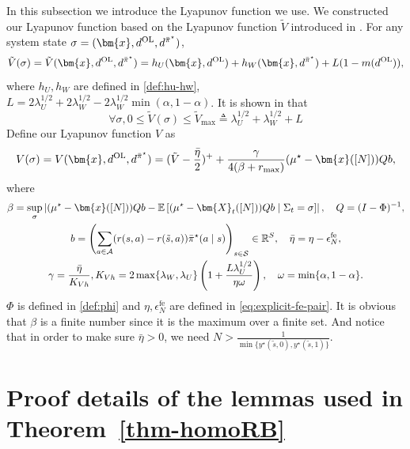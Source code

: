 \documentclass[mnsc,nonblindrev]{informs3}
\newcommand{\E}{\mathbb{E}}
\newcommand{\lwhalf}{\lambda_{W}^{1/2}}
\newcommand{\pibst}{\Bar{\pi}^\star}
\newcommand{\bmx}{\bm{x}}
\newcommand{\States}{\mathcal{S}}
\newcommand{\Actions}{\mathcal{A}}
\newcommand{\enfe}{\epsilon_N^{\mathrm{fe}}}
\begin{document}
\begin{APPENDICES}
In this subsection we introduce the Lyapunov function we use. We constructed our Lyapunov function based on the Lyapunov function $\tilde V$ introduced in \citet{hong2024achieving}. For any system state $\sigma=(\bmx,d^{\mathrm{OL}},d^{\pibst})$,
\begin{equation}\label{eq:def-Vtilde}
    \tilde{V}(\sigma)=\tilde V(\bmx,d^{\mathrm{OL}},d^{\pibst})=h_U(\bmx,d^{\mathrm{OL}})+h_W(\bmx,d^{\pibst})+L(1-m(d^{\mathrm{OL}})),
\end{equation}
where $h_U, h_W$ are defined in \eqref{def:hu-hw}, \(L = 2\lambda_U^{1/2}+2\lwhalf-2\lwhalf\min(\alpha,1-\alpha)\).
It is shown in \citet{hong2024achieving} that 
\begin{equation}\label{eq:def-Vtilde_max}
    \forall \sigma, 0\le \tilde V(\sigma)\le \tilde V_{\max}\triangleq\lambda_U^{1/2}+\lwhalf+L
\end{equation}
Define our Lyapunov function $V$ as
\begin{equation}\label{equ:defi-V}
    V(\sigma)=V(\bmx,d^{\mathrm{OL}},d^{\pibst})=(\tilde V-\frac{\bar\eta}{2})^++\frac{\gamma}{4(\beta+r_{\max})}(\mu^\star-\bmx([N]))Qb,
\end{equation}
where
\begin{equation}\label{eq:def-beta-Q-b-bareta-gamma}
    \begin{gathered}
        \beta=\sup_\sigma\left|(\mu^\star-\bmx([N]))Qb-\E\left[(\mu^\star-\bm{X}_t([N]))Qb\mid \Sigma_t=\sigma\right]\right|, 
        \quad Q=(I-\Phi)^{-1}, \\
        b=\left(\sum_{a\in\Actions}(r(s,a)-r(\tilde s,a))\pibst(a\mid s)\right)_{s\in\States}\in\mathbb{R}^S,
        \quad \bar\eta=\eta-\enfe, \\
        \gamma=\frac{\bar\eta}{K_{Vh}},K_{Vh}=2\max\{\lambda_W,\lambda_U\}\left(1+\frac{L\lambda_U^{1/2}}{\eta\omega}\right), 
        \quad \omega=\min\{\alpha,1-\alpha\}.
    \end{gathered}
\end{equation}
$\Phi$ is defined in \eqref{def:phi} and $\eta,\enfe$ are defined in \eqref{eq:explicit-fe-pair}. It is obvious that $\beta$ is a finite number since it is the maximum over a finite set. And notice that in order to make sure $\bar\eta>0$, we need 
$
N>\frac{1}{\min\{y^\star(\tilde{s},0), y^\star(\tilde{s},1)\}}.
$


\section{Proof details of the lemmas used in Theorem~\ref{thm-homoRB}}
\label{app:proof-thm-homoRB}









\end{APPENDICES}
\end{document}
